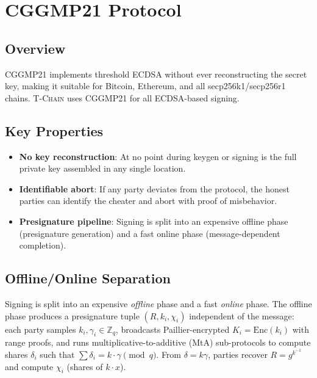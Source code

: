\documentclass[11pt,letterpaper]{article}
\theoremstyle{definition}
\theoremstyle{remark}
\newcommand{\TChain}{\textsc{T-Chain}}
\newcommand{\CGGMP}{\textsc{CGGMP21}}
\begin{document}
\section{CGGMP21 Protocol}
\label{sec:cggmp}

\subsection{Overview}

\CGGMP{} \cite{canetti2021cggmp} implements threshold ECDSA without ever reconstructing the secret key, making it suitable for Bitcoin, Ethereum, and all secp256k1/secp256r1 chains. \TChain{} uses \CGGMP{} for all ECDSA-based signing.

\subsection{Key Properties}

\begin{itemize}
\item \textbf{No key reconstruction}: At no point during keygen or signing is the full private key assembled in any single location.
\item \textbf{Identifiable abort}: If any party deviates from the protocol, the honest parties can identify the cheater and abort with proof of misbehavior.
\item \textbf{Presignature pipeline}: Signing is split into an expensive offline phase (presignature generation) and a fast online phase (message-dependent completion).
\end{itemize}

\subsection{Offline/Online Separation}

Signing is split into an expensive \emph{offline} phase and a fast \emph{online} phase. The offline phase produces a presignature tuple $(R, k_i, \chi_i)$ independent of the message: each party samples $k_i, \gamma_i \in \mathbb{Z}_q$, broadcasts Paillier-encrypted $K_i = \text{Enc}(k_i)$ with range proofs, and runs multiplicative-to-additive (MtA) sub-protocols to compute shares $\delta_i$ such that $\sum \delta_i = k \cdot \gamma \pmod{q}$. From $\delta = k\gamma$, parties recover $R = g^{k^{-1}}$ and compute $\chi_i$ (shares of $k \cdot x$).
\end{document}
